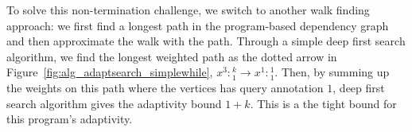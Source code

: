 To solve this non-termination challenge, we switch to another walk finding approach: we first find a  longest path in the program-based dependency graph and then approximate the walk with the path.
Through a simple deep first search algorithm, we find the longest weighted path as the dotted arrow in Figure~\ref{fig:alg_adaptsearch_simplewhile},
$x^3: {}^k_1 \to x^1: {}^1_1 $.
Then, by summing up the weights on this path where the vertices has query annotation $1$, deep first search algorithm gives the adaptivity bound $1 + k$.
This is a the tight bound for this program's adaptivity.

